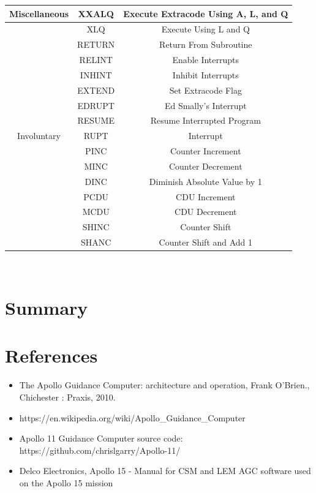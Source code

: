 \documentclass[a4paper,11pt]{article}
\begin{document}
\begin{center}
\begin{tabular}{| c | c | c |}
	Miscellaneous & XXALQ & Execute Extracode Using A, L, and Q \\ \hline
	& XLQ & Execute Using L and Q \\ \hline
	& RETURN & Return From Subroutine \\ \hline
	& RELINT & Enable Interrupts \\ \hline
	& INHINT & Inhibit Interrupts \\ \hline
	& EXTEND & Set Extracode Flag \\ \hline
	& EDRUPT & Ed Smally's Interrupt \\ \hline	
	& RESUME & Resume Interrupted Program \\ \hline	


	Involuntary & RUPT & Interrupt \\ \hline
	& PINC & Counter Increment \\ \hline
	& MINC & Counter Decrement \\ \hline
	& DINC & Diminish Absolute Value by 1 \\ \hline
	& PCDU & CDU Increment \\ \hline
	& MCDU & CDU Decrement \\ \hline
	& SHINC & Counter Shift \\ \hline
	& SHANC & Counter Shift and Add 1 \\ \hline
	
\end{tabular} \\
\end{center}


\section{Summary}



\section{References}

\begin{itemize}
  \item The Apollo Guidance Computer: architecture and operation, Frank O'Brien., Chichester : Praxis, 2010.
  \item https://en.wikipedia.org/wiki/Apollo\_Guidance\_Computer
  \item Apollo 11 Guidance Computer source code: https://github.com/chrislgarry/Apollo-11/
  \item Delco Electronics, Apollo 15 - Manual for CSM and LEM AGC software used on the Apollo 15 mission
\end{itemize}
\end{document}
